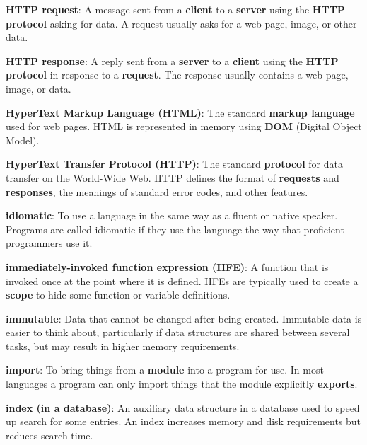 \documentclass[krantzl]{krantz}
\newcommand{\glosskey}[1]{\textbf{#1}}
\begin{document}
\noindent \textbf{{\newline}\glosskey{HTTP request}}: 
A message sent from a \glosskey{client} to a \glosskey{server} using the \glosskey{HTTP} \glosskey{protocol} asking for data. A request usually asks for a web page, image, or other data.


\noindent \textbf{{\newline}\glosskey{HTTP response}}: 
A reply sent from a \glosskey{server} to a \glosskey{client} using the \glosskey{HTTP} \glosskey{protocol} in response to a \glosskey{request}. The response usually contains a web page, image, or data.


\noindent \textbf{{\newline}\glosskey{HyperText Markup Language} (HTML)}: 
The standard \glosskey{markup language} used for web pages. HTML is represented in memory using \glosskey{DOM} (Digital Object Model).


\noindent \textbf{{\newline}\glosskey{HyperText Transfer Protocol} (HTTP)}: 
The standard \glosskey{protocol} for data transfer on the World-Wide Web. HTTP defines the format of \glosskey{requests} and \glosskey{responses}, the meanings of standard error codes, and other features.


\noindent \textbf{{\newline}\glosskey{idiomatic}}: 
To use a language in the same way as a fluent or native speaker. Programs are called idiomatic if they use the language the way that proficient programmers use it.


\noindent \textbf{{\newline}\glosskey{immediately-invoked function expression} (IIFE)}: 
A function that is invoked once at the point where it is defined.  IIFEs are typically used to create a \glosskey{scope} to hide some function or variable definitions.


\noindent \textbf{{\newline}\glosskey{immutable}}: 
Data that cannot be changed after being created. Immutable data is easier to think about, particularly if data structures are shared between several tasks, but may result in higher memory requirements.


\noindent \textbf{{\newline}\glosskey{import}}: 
To bring things from a \glosskey{module} into a program for use. In most languages a program can only import things that the module explicitly \glosskey{exports}.


\noindent \textbf{{\newline}\glosskey{index (in a database)}}: 
An auxiliary data structure in a database used to speed up search for some entries. An index increases memory and disk requirements but reduces search time.
\end{document}
